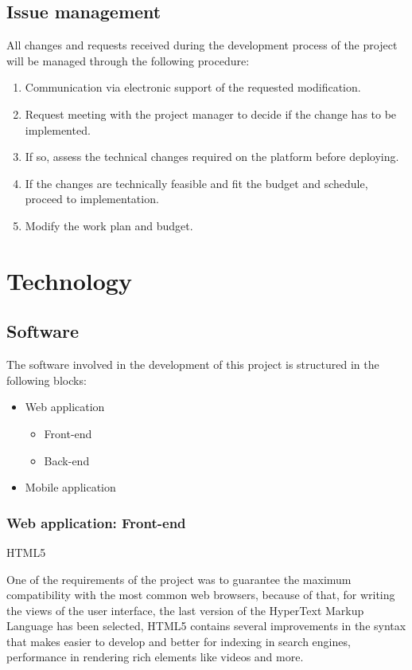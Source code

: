 \documentclass{DeustoFDP}
\begin{document}
\subsection{Issue management}
All changes and requests received during the development process of the project will be managed through the following procedure:
\begin{enumerate}
	\item Communication via electronic support of the requested modification.
	\item Request meeting with the project manager to decide if the change has to be implemented.
	\item If so, assess the technical changes required on the platform before deploying.
	\item If the changes are technically feasible and fit the budget and schedule, proceed to implementation.
	\item Modify the work plan and budget.
\end{enumerate}
\section{Technology}
\subsection{Software}
The software involved in the development of this project is structured in the following blocks:
\begin{itemize}
	\item Web application
	\begin{itemize}
		\item Front-end
		\item Back-end
	\end{itemize}
	\item Mobile application
\end{itemize}

\subsubsection{Web application: Front-end}
{\large HTML5}

One of the requirements of the project was to guarantee the maximum compatibility with the most common web browsers, because of that, for writing the views of the user interface, the last version of the HyperText Markup Language has been selected, HTML5 contains several improvements in the syntax that makes easier to develop and better for indexing in search engines, performance in rendering rich elements like videos and more.
\end{document}
